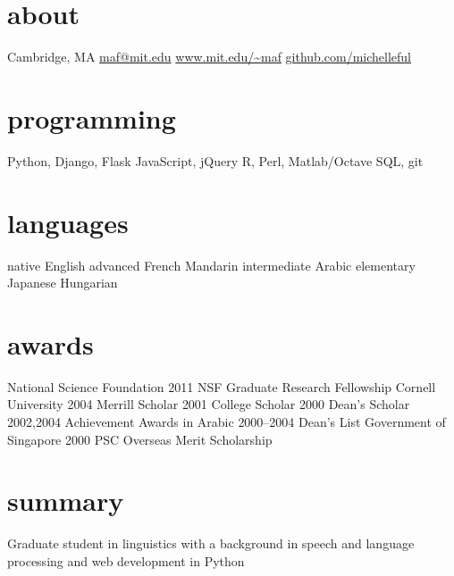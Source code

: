 \documentclass[]{friggeri-cv}
\begin{document}


\begin{aside}
  \section{about}
	Cambridge, MA
    \href{mailto:maf@mit.edu}{maf@mit.edu}
    \href{http://www.mit.edu/~maf}{www.mit.edu/\textasciitilde maf}
    \href{http://github.com/michelleful}{github.com/michelleful}
  \section{programming}
    Python, Django, Flask
    JavaScript, jQuery
	R, Perl, Matlab/Octave
	SQL, git
  \section{languages}
	{\footnotesize{}native} English
	{\footnotesize{}advanced} French
	         Mandarin
	{\footnotesize{}intermediate} Arabic
	{\footnotesize{}elementary} Japanese
	           Hungarian
  \section{awards}
    {\footnotesize{}National Science Foundation}
    {\footnotesize{}2011} NSF Graduate Research Fellowship
    {\footnotesize{}Cornell University} 
    {\footnotesize{}2004} Merrill Scholar
    {\footnotesize{}2001} College Scholar
    {\footnotesize{}2000} Dean's Scholar
    {\footnotesize{}2002,2004} Achievement Awards in Arabic
    {\footnotesize{}2000--2004} Dean's List
    {\footnotesize{}Government of Singapore}
    {\footnotesize{}2000} PSC Overseas Merit Scholarship 
\end{aside}

\section{summary}

Graduate student in linguistics with a background in speech and language processing and web development in Python
\end{document}
